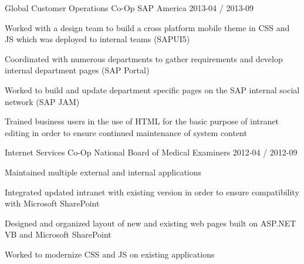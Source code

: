 \documentclass[11pt, a4paper]{awesomecv}
\begin{document}
\begin{cventries}
  \cventry
    {Global Customer Operations Co-Op}
    {SAP America}
    {}
    {2013-04 / 2013-09}
    {
          \begin{cvitems}
                    \item{Worked with a design team to build a cross platform mobile theme in CSS and JS which was deployed to internal teams (SAPUI5)}
                    \item{Coordinated with numerous departments to gather requirements and develop internal department pages (SAP Portal)}
                    \item{Worked to build and update department specific pages on the SAP internal social network (SAP JAM)}
                    \item{Trained business users in the use of HTML for the basic purpose of intranet editing in order to ensure continued maintenance of system content}
          \end{cvitems}
    }
 
  \cventry
    {Internet Services Co-Op}
    {National Board of Medical Examiners}
    {}
    {2012-04 / 2012-09}
    {
          \begin{cvitems}
                    \item{Maintained multiple external and internal applications}
                    \item{Integrated updated intranet with existing version in order to ensure compatibility with Microsoft SharePoint}
                    \item{Designed and organized layout of new and existing web pages built on ASP.NET VB and Microsoft SharePoint}
                    \item{Worked to modernize CSS and JS on existing applications}
          \end{cvitems}
    }
 

\end{cventries}
\end{document}
